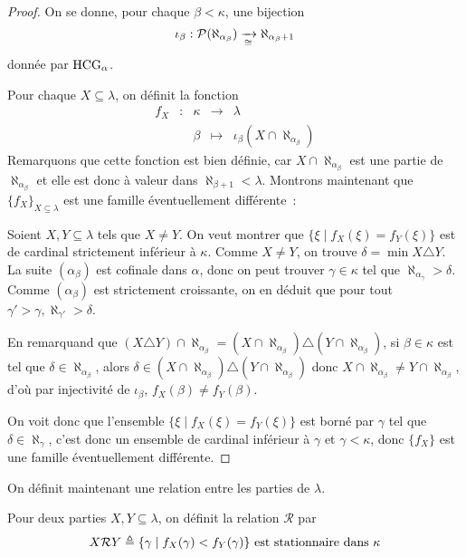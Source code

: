 \begin{proof}
  On se donne, pour chaque $\beta < \kappa$, une bijection
  \[\iota_\beta : \mathcal{P}(\aleph_{\alpha_\beta}) \xrightarrow[\cong]{}
  \aleph_{\alpha_\beta + 1}\]
  donnée par $\operatorname{HCG}_\alpha$.

  Pour chaque $X\subseteq \lambda$, on définit la fonction
  \[\begin{array}{ccccc}
  f_X & : & \kappa & \longrightarrow & \lambda\\
  & & \beta &\longmapsto & \iota_\beta(X \cap \aleph_{\alpha_\beta})
  \end{array}\]
  Remarquons que cette fonction est bien définie, car
  $X\cap \aleph_{\alpha_\beta}$ est une partie de $\aleph_{\alpha_\beta}$ et elle est
  donc à valeur dans $\aleph_{\beta + 1} < \lambda$. Montrons maintenant que
  $\{f_X\}_{X\subseteq \lambda}$ est une famille éventuellement différente~:

  Soient $X,Y\subseteq \lambda$ tels que $X\neq Y$. On veut montrer que
  $\{\xi \mid f_X(\xi) = f_Y(\xi)\}$ est de cardinal strictement inférieur à
  $\kappa$. Comme $X\neq Y$, on trouve $\delta = \min X \triangle Y$. La suite
  $(\alpha_\beta)$ est cofinale dans $\alpha$, donc on peut trouver
  $\gamma\in \kappa$ tel que $\aleph_{\alpha_\gamma} > \delta$. Comme
  $(\alpha_\beta)$ est strictement croissante, on en déduit que pour tout
  $\gamma' > \gamma, \aleph_{\gamma'} > \delta$.

  En remarquand que
  $(X\triangle Y) \cap \aleph_{\alpha_\beta} =
  (X\cap \aleph_{\alpha_\beta})\triangle (Y\cap \aleph_{\alpha_\beta})$,
  si $\beta \in \kappa$ est tel que $\delta \in \aleph_{\alpha_\beta}$, alors
  $\delta\in(X\cap \aleph_{\alpha_\beta})\triangle (Y\cap \aleph_{\alpha_\beta})$
  donc $X\cap \aleph_{\alpha_\beta}\neq Y\cap \aleph_{\alpha_\beta}$,
  d'où par injectivité de $\iota_\beta$, $f_X(\beta) \neq f_Y(\beta)$.

  On voit donc que l'ensemble $\{\xi\mid f_X(\xi) = f_Y(\xi)\}$ est borné par
  $\gamma$ tel que $\delta \in \aleph_\gamma$, c'est donc un ensemble de
  cardinal inférieur à $\gamma$ et $\gamma < \kappa$, donc $\{f_X\}$ est une
  famille éventuellement différente.
\end{proof}

On définit maintenant une relation entre les parties de $\lambda$.

\begin{definition}
  Pour deux parties $X,Y\subseteq \lambda$, on définit la relation
  $\mathcal R$ par
  \[X \mathcal R Y\triangleq \{\gamma\mid f_X(\gamma) < f_Y(\gamma)\}
  \text{ est stationnaire dans }\kappa\]
\end{definition}


